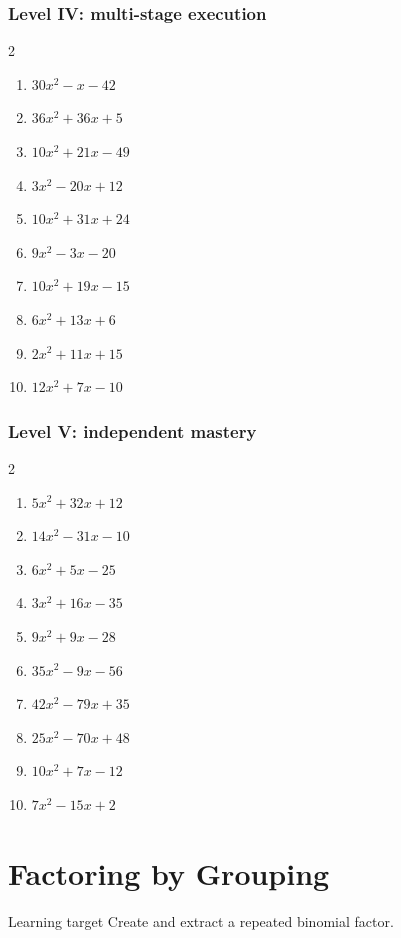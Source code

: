 \documentclass[11pt,oneside]{book}
\begin{document}
\subsection*{Level IV: multi-stage execution}
\begin{multicols}{2}
\begin{enumerate}[leftmargin=*,label=\textbf{\arabic*.},itemsep=0.65\baselineskip]
\item $ 30 x^{2} - x - 42 $
\item $ 36 x^{2} + 36 x + 5 $
\item $ 10 x^{2} + 21 x - 49 $
\item $ 3 x^{2} - 20 x + 12 $
\item $ 10 x^{2} + 31 x + 24 $
\item $ 9 x^{2} - 3 x - 20 $
\item $ 10 x^{2} + 19 x - 15 $
\item $ 6 x^{2} + 13 x + 6 $
\item $ 2 x^{2} + 11 x + 15 $
\item $ 12 x^{2} + 7 x - 10 $
\end{enumerate}
\end{multicols}
\subsection*{Level V: independent mastery}
\begin{multicols}{2}
\begin{enumerate}[leftmargin=*,label=\textbf{\arabic*.},itemsep=0.65\baselineskip]
\item $ 5 x^{2} + 32 x + 12 $
\item $ 14 x^{2} - 31 x - 10 $
\item $ 6 x^{2} + 5 x - 25 $
\item $ 3 x^{2} + 16 x - 35 $
\item $ 9 x^{2} + 9 x - 28 $
\item $ 35 x^{2} - 9 x - 56 $
\item $ 42 x^{2} - 79 x + 35 $
\item $ 25 x^{2} - 70 x + 48 $
\item $ 10 x^{2} + 7 x - 12 $
\item $ 7 x^{2} - 15 x + 2 $
\end{enumerate}
\end{multicols}
\chapter{Factoring by Grouping}
\begin{rulebox}{Learning target}
Create and extract a repeated binomial factor.
\end{rulebox}
\end{document}
